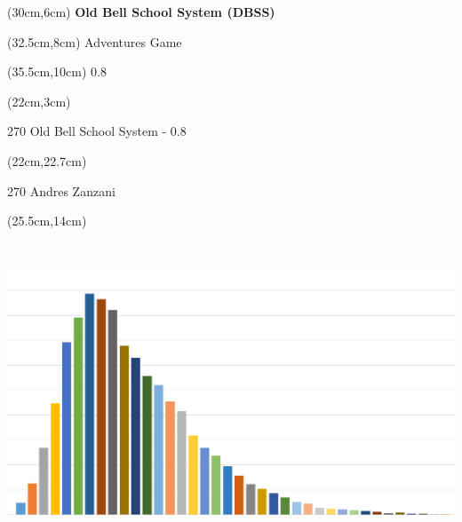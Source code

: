 \documentclass[10pt,a4paper]{article}
\def \versione {0.8}
\begin{document}
\pdfpagewidth=459.26mm
\thispagestyle{empty}

\begin{textblock*}{20cm}(30cm,6cm) %
\Huge \textbf{Old Bell School System (DBSS)}\\

\end{textblock*}

\begin{textblock*}{20cm}(32.5cm,8cm) %
\calligra\Huge{Adventures Game}\\

\end{textblock*}

\begin{textblock*}{20cm}(35.5cm,10cm) %
		{\LARGE \versione}
\end{textblock*}

\begin{textblock*}{20cm}(22cm,3cm) %
\begin{turn}{270}
	{\Huge Old Bell School System - \versione}\\
\end{turn}
\end{textblock*}


\begin{textblock*}{20cm}(22cm,22.7cm) %
\begin{turn}{270}
	{\Huge Andres Zanzani}
\end{turn}
\end{textblock*}



\begin{textblock*}{20cm}(25.5cm,14cm) %
	\includegraphics[bb=0 0 1148 636,width=6.85139in,height=3.79514in]{copertina.png}
\end{textblock*}
\end{document}
